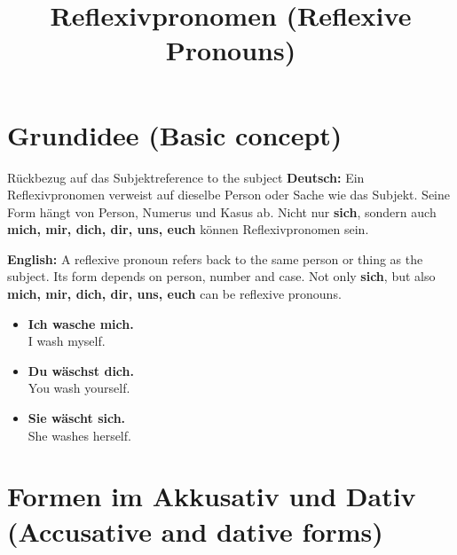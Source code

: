 \documentclass[a4paper,11pt]{article}
\title{Reflexivpronomen (Reflexive Pronouns)}
\date{}
\newcommand{\GermanText}[1]{\textbf{Deutsch: }#1\par}
\newcommand{\EnglishText}[1]{{\small\color{SoftGray}\textbf{English: }#1\par}}
\newcommand{\ExampleItem}[2]{\item \textbf{#1}\\{\small\color{SoftGray}#2}}
\begin{document}
\maketitle
\tableofcontents
\newpage

\section{Grundidee (Basic concept)}

    \begin{grammarentry}{Rückbezug auf das Subjekt}{reference to the subject}
        \GermanText{Ein Reflexivpronomen verweist auf dieselbe Person oder Sache wie das Subjekt. Seine Form hängt von Person, Numerus und Kasus ab. Nicht nur \textbf{sich}, sondern auch \textbf{mich, mir, dich, dir, uns, euch} können Reflexivpronomen sein.}
        \EnglishText{A reflexive pronoun refers back to the same person or thing as the subject. Its form depends on person, number and case. Not only \textbf{sich}, but also \textbf{mich, mir, dich, dir, uns, euch} can be reflexive pronouns.}
        \begin{exbox}
            \begin{itemize}
                \ExampleItem{Ich wasche mich.}{I wash myself.}
                \ExampleItem{Du wäschst dich.}{You wash yourself.}
                \ExampleItem{Sie wäscht sich.}{She washes herself.}
            \end{itemize}
        \end{exbox}
    \end{grammarentry}

\section{Formen im Akkusativ und Dativ (Accusative and dative forms)}
\end{document}

